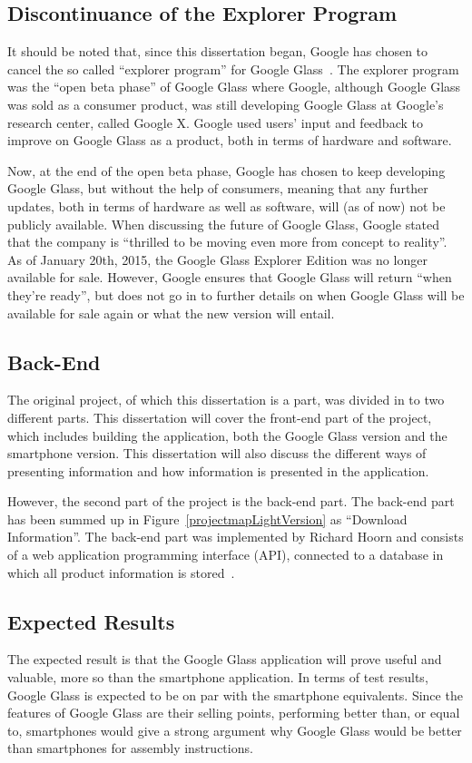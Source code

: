 \subsection{Discontinuance of the Explorer Program}
It should be noted that, since this dissertation began, Google has chosen to cancel the so called ``explorer program'' for Google Glass~\cite{glassDiscontinued}. The explorer program was the ``open beta phase'' of Google Glass where Google, although Google Glass was sold as a consumer product, was still developing Google Glass at Google's research center, called Google X. Google used users' input and feedback to improve on Google Glass as a product, both in terms of hardware and software.

Now, at the end of the open beta phase, Google has chosen to keep developing Google Glass, but without the help of consumers, meaning that any further updates, both in terms of hardware as well as software, will (as of now) not be publicly available. When discussing the future of Google Glass, Google stated that the company is ``thrilled to be moving even more from concept to reality''. As of January 20th, 2015, the Google Glass Explorer Edition was no longer available for sale. However, Google ensures that Google Glass will return ``when they're ready'', but does not go in to further details on when Google Glass will be available for sale again or what the new version will entail. 

\subsection{Back-End}
The original project, of which this dissertation is a part, was divided in to two different parts. This dissertation will cover the front-end part of the project, which includes building the application, both the Google Glass version and the smartphone version. This dissertation will also discuss the different ways of presenting information and how information is presented in the application.

However, the second part of the project is the back-end part. The back-end part has been summed up in Figure~\ref{projectmapLightVersion} as ``Download Information''. The back-end part was implemented by Richard Hoorn and consists of a web application programming interface (API), connected to a database in which all product information is stored~\cite{hoorn}. 

\subsection{Expected Results}
The expected result is that the Google Glass application will prove useful and valuable, more so than the smartphone application. In terms of test results, Google Glass is expected to be on par with the smartphone equivalents. Since the features of Google Glass are their selling points, performing better than, or equal to, smartphones would give a strong argument why Google Glass would be better than smartphones for assembly instructions.


